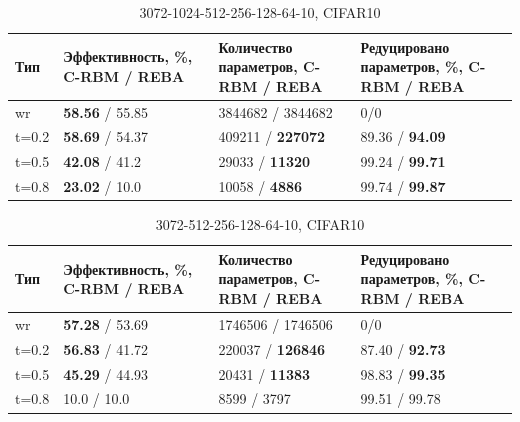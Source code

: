 \begin{table} [!h]
  \small
  \caption{3072-1024-512-256-128-64-10, CIFAR10}\label{table:cifar_10_1}
\centering
\begin{tabular}{| p{2cm} | p{4cm} | p{4cm} | p{4cm} |}
  \hline
    \textbf{Тип} & \textbf{Эффективность, \%, C-RBM / REBA} & \textbf{Количество параметров, C-RBM / REBA} & \textbf{Редуцировано параметров, \%, C-RBM / REBA}\\
    \hline
    wr & \textbf{58.56} / 55.85 & 3844682 / 3844682 & 0/0\\
    \hline
    t=0.2 & \textbf{58.69} / 54.37 & 409211 / \textbf{227072} & 89.36 / \textbf{94.09}\\
    \hline
    t=0.5 & \textbf{42.08} / 41.2 & 29033 / \textbf{11320} & 99.24 / \textbf{99.71}\\
    \hline
    t=0.8 & \textbf{23.02} / 10.0 & 10058 / \textbf{4886} & 99.74 / \textbf{99.87}\\
    \hline
\end{tabular}
\end{table}

\begin{table} [!h]
  \small
  \caption{3072-512-256-128-64-10, CIFAR10 }\label{table:cifar_10_2}
\centering
\begin{tabular}{| p{2cm} | p{4cm} | p{4cm} | p{4cm} |}
  \hline
    \textbf{Тип} & \textbf{Эффективность, \%, C-RBM / REBA} & \textbf{Количество параметров, C-RBM / REBA} & \textbf{Редуцировано параметров, \%, C-RBM / REBA}\\
    \hline
    wr & \textbf{57.28} / 53.69 & 1746506 / 1746506 & 0/0\\
    \hline
    t=0.2 & \textbf{56.83} / 41.72 & 220037 / \textbf{126846} & 87.40 / \textbf{92.73}\\
    \hline
    t=0.5 & \textbf{45.29} / 44.93 & 20431 / \textbf{11383} & 98.83 / \textbf{99.35}\\
    \hline
    t=0.8 & 10.0 / 10.0 & 8599 / 3797 & 99.51 / 99.78\\
    \hline
\end{tabular}
\end{table}

